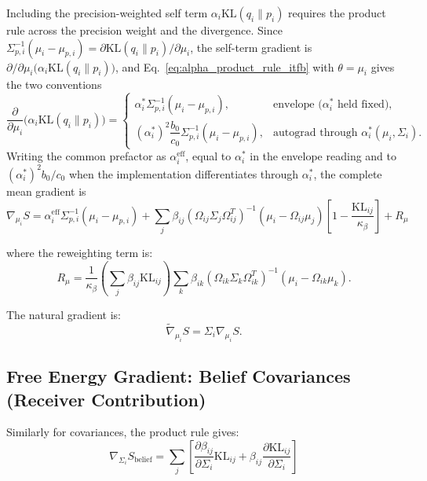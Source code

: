 \documentclass[11pt]{article}
\begin{document}
Including the precision-weighted self term $\alpha_i \mathrm{KL}(q_i \| p_i)$ requires the product rule across the precision weight and the divergence. Since $\Sigma_{p,i}^{-1}(\mu_i - \mu_{p,i}) = \partial \mathrm{KL}(q_i \| p_i)/\partial \mu_i$, the self-term gradient is $\partial/\partial\mu_i\bigl(\alpha_i \mathrm{KL}(q_i \| p_i)\bigr)$, and Eq.~\eqref{eq:alpha_product_rule_itfb} with $\theta = \mu_i$ gives the two conventions
\begin{equation}
\frac{\partial}{\partial \mu_i}\bigl(\alpha_i \mathrm{KL}(q_i \| p_i)\bigr) =
\begin{cases}
\alpha_i^* \Sigma_{p,i}^{-1}(\mu_i - \mu_{p,i}), & \text{envelope ($\alpha_i^*$ held fixed)}, \\[4pt]
(\alpha_i^*)^2 \dfrac{b_0}{c_0} \Sigma_{p,i}^{-1}(\mu_i - \mu_{p,i}), & \text{autograd through } \alpha_i^*(\mu_i, \Sigma_i).
\end{cases}
\end{equation}
Writing the common prefactor as $\alpha_i^{\mathrm{eff}}$, equal to $\alpha_i^*$ in the envelope reading and to $(\alpha_i^*)^2 b_0/c_0$ when the implementation differentiates through $\alpha_i^*$, the complete mean gradient is
\begin{equation}
\boxed{\nabla_{\mu_i} S = \alpha_i^{\mathrm{eff}}\Sigma_{p,i}^{-1}(\mu_i - \mu_{p,i}) + \sum_j \beta_{ij} (\Omega_{ij}\Sigma_j\Omega_{ij}^T)^{-1}(\mu_i - \Omega_{ij}\mu_j) \left[1 - \frac{\mathrm{KL}_{ij}}{\kappa_\beta}\right] + R_\mu}
\end{equation}

where the reweighting term is:
\begin{equation}
R_\mu = \frac{1}{\kappa_\beta}\left(\sum_j \beta_{ij}\mathrm{KL}_{ij}\right) \sum_k \beta_{ik} (\Omega_{ik}\Sigma_k\Omega_{ik}^T)^{-1}(\mu_i - \Omega_{ik}\mu_k).
\end{equation}

The natural gradient is:
\begin{equation}
\tilde{\nabla}_{\mu_i} S = \Sigma_i \nabla_{\mu_i} S.
\end{equation}

\subsection*{Free Energy Gradient: Belief Covariances (Receiver Contribution)}

Similarly for covariances, the product rule gives:
\begin{equation}
\nabla_{\Sigma_i} S_{\mathrm{belief}} = \sum_j \left[ \frac{\partial \beta_{ij}}{\partial \Sigma_i} \mathrm{KL}_{ij} + \beta_{ij} \frac{\partial \mathrm{KL}_{ij}}{\partial \Sigma_i} \right]
\end{equation}
\end{document}

